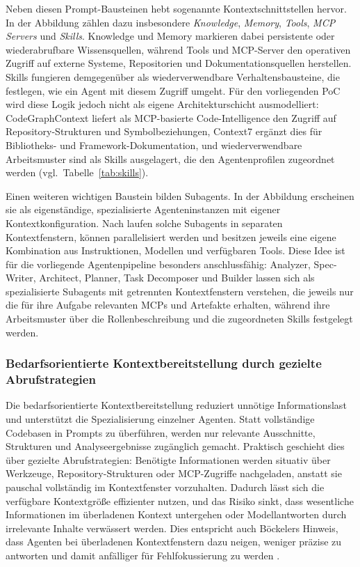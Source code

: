 Neben diesen Prompt-Bausteinen hebt \textcite{boeckeler2026contextengineering} sogenannte Kontextschnittstellen hervor. In der Abbildung zählen dazu insbesondere \emph{Knowledge}, \emph{Memory}, \emph{Tools}, \emph{MCP Servers} und \emph{Skills}. Knowledge und Memory markieren dabei persistente oder wiederabrufbare Wissensquellen, während Tools und MCP-Server den operativen Zugriff auf externe Systeme, Repositorien und Dokumentationsquellen herstellen. Skills fungieren demgegenüber als wiederverwendbare Verhaltensbausteine, die festlegen, wie ein Agent mit diesem Zugriff umgeht. Für den vorliegenden PoC wird diese Logik jedoch nicht als eigene Architekturschicht ausmodelliert: CodeGraphContext liefert als MCP-basierte Code-Intelligence den Zugriff auf Repository-Strukturen und Symbolbeziehungen, Context7 ergänzt dies für Bibliotheks- und Framework-Dokumentation, und wiederverwendbare Arbeitsmuster sind als Skills ausgelagert, die den Agentenprofilen zugeordnet werden (vgl.\ Tabelle~\ref{tab:skills}).

Einen weiteren wichtigen Baustein bilden Subagents. In der Abbildung erscheinen sie als eigenständige, spezialisierte Agenteninstanzen mit eigener Kontextkonfiguration. Nach \textcite{boeckeler2026contextengineering} laufen solche Subagents in separaten Kontextfenstern, können parallelisiert werden und besitzen jeweils eine eigene Kombination aus Instruktionen, Modellen und verfügbaren Tools. Diese Idee ist für die vorliegende Agentenpipeline besonders anschlussfähig: Analyzer, Spec-Writer, Architect, Planner, Task Decomposer und Builder lassen sich als spezialisierte Subagents mit getrennten Kontextfenstern verstehen, die jeweils nur die für ihre Aufgabe relevanten MCPs und Artefakte erhalten, während ihre Arbeitsmuster über die Rollenbeschreibung und die zugeordneten Skills festgelegt werden.

\subsubsection{Bedarfsorientierte Kontextbereitstellung durch gezielte Abrufstrategien}

Die bedarfsorientierte Kontextbereitstellung reduziert unnötige Informationslast und unterstützt die Spezialisierung einzelner Agenten. Statt vollständige Codebasen in Prompts zu überführen, werden nur relevante Ausschnitte, Strukturen und Analyseergebnisse zugänglich gemacht. Praktisch geschieht dies über gezielte Abrufstrategien: Benötigte Informationen werden situativ über Werkzeuge, Repository-Strukturen oder MCP-Zugriffe nachgeladen, anstatt sie pauschal vollständig im Kontextfenster vorzuhalten. Dadurch lässt sich die verfügbare Kontextgröße effizienter nutzen, und das Risiko sinkt, dass wesentliche Informationen im überladenen Kontext untergehen oder Modellantworten durch irrelevante Inhalte verwässert werden. Dies entspricht auch Böckelers Hinweis, dass Agenten bei überladenen Kontextfenstern dazu neigen, weniger präzise zu antworten und damit anfälliger für Fehlfokussierung zu werden \parencite{boeckeler2026contextengineering}.

